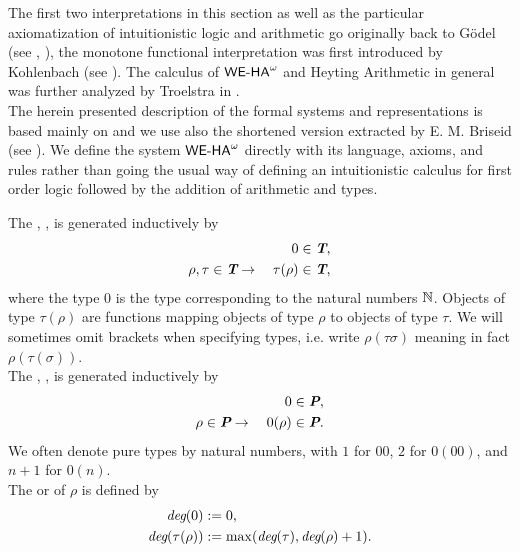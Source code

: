 \bigskip
%
%
%
The first two interpretations in this section as well as the particular 
axiomatization of intuitionistic logic and arithmetic
go originally back to G\"odel (see \cite{Goedel33}, \cite{Goedel58}), 
the monotone functional interpretation was first introduced
by Kohlenbach (see \cite{Kohlenbach96mfi}).
The calculus of ${\textsf{\upshape WE-HA}}^{\omega}$ and Heyting Arithmetic in general was further
analyzed by Troelstra in \cite{Troelstra73}.\\
The herein presented description of the formal systems and representations
is based mainly on \cite{Kohlenbach08} and we use also the shortened version
extracted by E. M. Briseid (see \cite{Briseid05}).
We define the system ${\textsf{\upshape WE-HA}}^{\omega}$ directly
with its language, axioms, and rules rather than going the usual way of
defining an intuitionistic calculus for first order logic
 followed by the addition of arithmetic and
types.
%
%
%
%
\begin{dfn}\label{d:Tp}
The , , is generated
inductively by
\begin{align*}
0 &\in \emph{\protect\textbf{T}} \text{,} \\
\rho,\tau \in  \emph{\protect\textbf{T}} \rightarrow\quad \tau(\rho) &\in  \emph{\protect\textbf{T}}
\text{,}\end{align*} 
where the type $0$ is the type corresponding to the natural numbers $\mathbb{N}$.
Objects of type $\tau(\rho)$ are functions mapping 
objects of type $\rho$ to objects of type $\tau$. We will sometimes 
omit brackets when specifying types, i.e. write $\rho(\tau \sigma)$ 
meaning in fact $\rho(\tau(\sigma))$.\\
The , , is generated
inductively by
\begin{align*}
0 &\in \emph{\protect\textbf{P}} \text{,}\\
\rho \in \emph{\protect\textbf{P}} \rightarrow\quad 0(\rho) &\in  \emph{\protect\textbf{P}} 
\text{.}\end{align*} 
We often denote pure types by natural numbers, with $1$ for
$00$, $2$ for $0(00)$, and $n+1$ for $0(n)$.\\
The  or  of $\rho$ is defined by
\begin{align*}
\emph{deg}(0) &: = 0 \text{,} \\
\emph{deg}(\tau(\rho)) &: = \max (\emph{deg}(\tau), \emph{deg}(\rho)+1)
\text{.}
\end{align*} 
\end{dfn}
